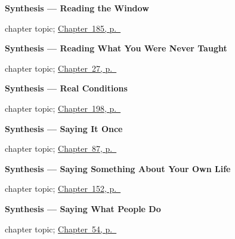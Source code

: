 \noindent\begin{minipage}[t]{\linewidth}
\raggedright
\textbf{Synthesis --- Reading the Window}\par
\footnotesize chapter topic; \hyperref[ch:synthesis-se]{Chapter~185, p.~\pageref*{ch:synthesis-se}}
\end{minipage}\par\smallskip

\noindent\begin{minipage}[t]{\linewidth}
\raggedright
\textbf{Synthesis --- Reading What You Were Never Taught}\par
\footnotesize chapter topic; \hyperref[ch:synthesis-friends]{Chapter~27, p.~\pageref*{ch:synthesis-friends}}
\end{minipage}\par\smallskip

\noindent\begin{minipage}[t]{\linewidth}
\raggedright
\textbf{Synthesis --- Real Conditions}\par
\footnotesize chapter topic; \hyperref[ch:sintesis-condicion]{Chapter~198, p.~\pageref*{ch:sintesis-condicion}}
\end{minipage}\par\smallskip

\noindent\begin{minipage}[t]{\linewidth}
\raggedright
\textbf{Synthesis --- Saying It Once}\par
\footnotesize chapter topic; \hyperref[ch:synthesis-say-it-once]{Chapter~87, p.~\pageref*{ch:synthesis-say-it-once}}
\end{minipage}\par\smallskip

\noindent\begin{minipage}[t]{\linewidth}
\raggedright
\textbf{Synthesis --- Saying Something About Your Own Life}\par
\footnotesize chapter topic; \hyperref[ch:spanish-synthesis-describing]{Chapter~152, p.~\pageref*{ch:spanish-synthesis-describing}}
\end{minipage}\par\smallskip

\noindent\begin{minipage}[t]{\linewidth}
\raggedright
\textbf{Synthesis --- Saying What People Do}\par
\footnotesize chapter topic; \hyperref[ch:sintesis-trabajo]{Chapter~54, p.~\pageref*{ch:sintesis-trabajo}}
\end{minipage}\par\smallskip

